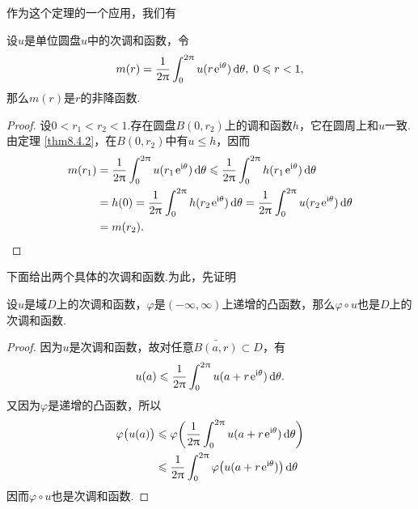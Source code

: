 作为这个定理的一个应用，我们有
\begin{theorem}\label{thm8.4.3}
  设$u$是单位圆盘$u$中的次调和函数，令
  \[
    m(r) = \frac1{2\uppi}\int_0^{2\uppi}u(r\operatorname{\!\!\;\mathrm e}^{\mathrm i\theta})\mathop{}\!\mathrm{d} \theta,\;0 \leqslant r < 1,
  \]
  那么$m(r)$是$r$的非降函数.
\end{theorem}
\begin{proof}
  设$0<r_1<r_2<1$.存在圆盘$B(0,r_2)$上的调和函数$h$，它在圆周上和$u$一致.由定理 \ref{thm8.4.2}，在$B(0,r_2)$中有$u\le h$，因而
  \begin{align*}
    m(r_1) & = \frac1{2\pi}\int_0^{2\pi}u(r_1\ee^{\ii\theta})\dif \theta
    \le \frac1{2\pi}\int_0^{2\pi} h(r_1\ee^{\ii\theta})
    \dif \theta\\
    &  = h(0) = \frac1{2\pi}\int_0^{2\pi}h(r_2\ee^{\ii\theta})
    \dif \theta
    = \frac1{2\pi}\int_0^{2\pi}u(r_2\ee^{\ii\theta})\dif \theta\\
    & = m(r_2). \qedhere
  \end{align*}
\end{proof}

下面给出两个具体的次调和函数.为此，先证明
\begin{prop}\label{prop8.4.4}
  设$u$是域$D$上的次调和函数，$\varphi$是$(-\infty,\infty)$上递增的凸函数，那么$\varphi\circ u$也是$D$上的次调和函数.
\end{prop}
\begin{proof}
  因为$u$是次调和函数，故对任意$\bar{B(a,r)}\subset D$，有
  \[
    u(a) \leqslant \frac1{2\uppi}\int_0^{2\uppi}u(a+r\operatorname{\!\!\;\mathrm e}^{\mathrm i\theta})\mathop{}\!\mathrm{d} \theta.
  \]
  又因为$\varphi$是递增的凸函数，所以
  \begin{align*}
    \varphi\big(u(a)\big)&\leqslant\varphi\bigg(\frac1{2\uppi}\int_0^{2\uppi}u(a+r\operatorname{\!\!\;\mathrm e}^{\mathrm i\theta})\mathop{}\!\mathrm{d} \theta\bigg)\\
    & \leqslant \frac1{2\uppi}\int_0^{2\uppi}\varphi\big(u(a+r\operatorname{\!\!\;\mathrm e}^{\mathrm i\theta})\big)\mathop{}\!\mathrm{d} \theta
  \end{align*}
  因而$\varphi\circ u$也是次调和函数.
\end{proof}

